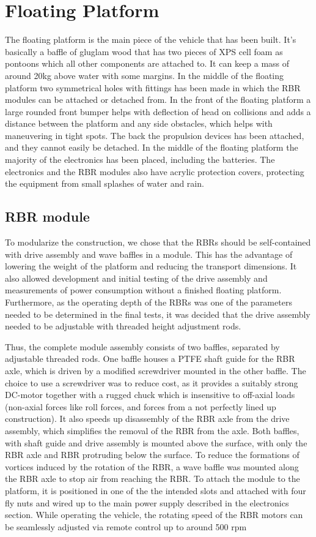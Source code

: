 \section{Floating Platform}
The floating platform is the main piece of the vehicle that has been built. It's basically a baffle of gluglam wood that has two pieces of XPS cell foam as pontoons which all other components are attached to. It can keep a mass of around 20kg above water with some margins. In the middle of the floating platform two symmetrical holes with fittings has been made in which the RBR modules can be attached or detached from. In the front of the floating platform a large rounded front bumper helps with deflection of head on collisions and adds a distance between the platform and any side obstacles, which helps with maneuvering in tight spots. The back the propulsion devices has been attached, and they cannot easily be detached. In the middle of the floating platform the majority of the electronics has been placed, including the batteries. The electronics and the RBR modules also have acrylic protection covers, protecting the equipment from small splashes of water and rain.           

\subsection{RBR module}
To modularize the construction, we chose that the RBRs should be self-contained with drive assembly and wave baffles in a module. This has the advantage of lowering the weight of the platform and reducing the transport dimensions. It also allowed development and initial testing of the drive assembly and measurements of power consumption without a finished floating platform. Furthermore, as the operating depth of the RBRs was one of the parameters needed to be determined in the final tests, it was decided that the drive assembly needed to be adjustable with threaded height adjustment rods.

Thus, the complete module assembly consists of two baffles, separated by adjustable threaded rods. One baffle houses a PTFE shaft guide for the RBR axle, which is driven by a modified screwdriver mounted in the other baffle. The choice to use a screwdriver was to reduce cost, as it provides a suitably strong DC-motor together with a rugged chuck which is insensitive to off-axial loads (non-axial forces like roll forces, and forces from a not perfectly lined up construction). It also speeds up disassembly of the RBR axle from the drive assembly, which simplifies the removal of the RBR from the axle. Both baffles, with shaft guide and drive assembly is mounted above the surface, with only the RBR axle and RBR protruding below the surface. To reduce the formations of vortices induced by the rotation of the RBR, a wave baffle was mounted along the RBR axle to stop air from reaching the RBR. To attach the module to the platform, it is positioned in one of the the intended slots and attached with four fly nuts and wired up to the main power supply described in the electronics section. While operating the vehicle, the rotating speed of the RBR motors can be seamlessly adjusted via remote control up to around 500 rpm
